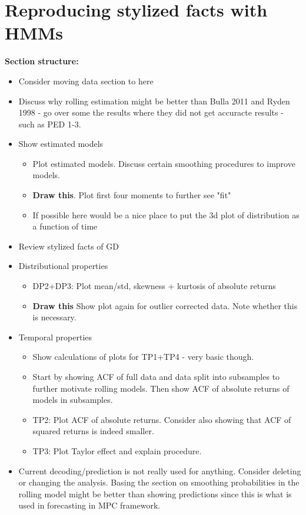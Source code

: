 \newpage

\section{Reproducing stylized facts with HMMs}
\label{Section: Stylized facts}


\textbf{Section structure:}
\begin{itemize}
    \item Consider moving data section to here
    \item Discuss why rolling estimation might be better than Bulla 2011 and Ryden 1998 - go over some the results where they did not get accuracte results - such as PED 1-3.
    \item Show estimated models
    \begin{itemize}
        \item Plot estimated models. Discuss certain smoothing procedures to improve models.
        \item \textbf{Draw this}. Plot first four moments to further see "fit"
        \item If possible here would be a nice place to put the 3d plot of distribution as a function of time
    \end{itemize} 
    \item Review stylized facts of GD
    \item Distributional properties
    \begin{itemize}
        \item DP2+DP3: Plot mean/std, skewness + kurtosis of absolute returns
        \item \textbf{Draw this} Show plot again for outlier corrected data. Note whether this is necessary.
    \end{itemize}
    \item Temporal properties
    \begin{itemize}
        \item Show calculations of plots for TP1+TP4 - very basic though.
        \item Start by showing ACF of full data and data split into subsamples to further motivate rolling models. Then show ACF of absolute returns of models in subsamples.
        \item TP2: Plot ACF of absolute returns. Consider also showing that ACF of squared returns is indeed smaller.
        \item TP3: Plot Taylor effect and explain procedure.
        
    \end{itemize}
    \item Current decoding/prediction is not really used for anything. Consider deleting or changing the analysis. Basing the section on smoothing probabilities in the rolling model might be better than showing predictions since this is what is used in forecasting in MPC framework.
\end{itemize}

